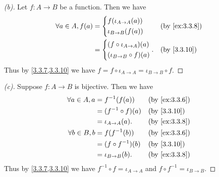 \begin{proof}[(b)]
  Let \(f : A \to B\) be a function.
  Then we have
  \begin{align*}
    \forall a \in A, f(a) & = \begin{dcases}
                                f(\iota_{A \to A}(a)) \\
                                \iota_{B \to B}(f(a))
                              \end{dcases}        &  & \by{ex:3.3.8} \\
                          & = \begin{dcases}
                                (f \circ \iota_{A \to A})(a) \\
                                (\iota_{B \to B} \circ f)(a)
                              \end{dcases}. &  & \by{3.3.10}
  \end{align*}
  Thus by \cref{3.3.7,3.3.10} we have \(f = f \circ \iota_{A \to A} = \iota_{B \to B} \circ f\).
\end{proof}

\begin{proof}[(c)]
  Suppose \(f : A \to B\) is bijective.
  Then we have
  \begin{align*}
    \forall a \in A, a & = f^{-1}(f(a))        &  & \by{ex:3.3.6} \\
                       & = (f^{-1} \circ f)(a) &  & \by{3.3.10}   \\
                       & = \iota_{A \to A}(a). &  & \by{ex:3.3.8} \\
    \forall b \in B, b & = f(f^{-1}(b))        &  & \by{ex:3.3.6} \\
                       & = (f \circ f^{-1})(b) &  & \by{3.3.10}   \\
                       & = \iota_{B \to B}(b). &  & \by{ex:3.3.8}
  \end{align*}
  Thus by \cref{3.3.7,3.3.10} we have \(f^{-1} \circ f = \iota_{A \to A}\) and \(f \circ f^{-1} = \iota_{B \to B}\).
\end{proof}


